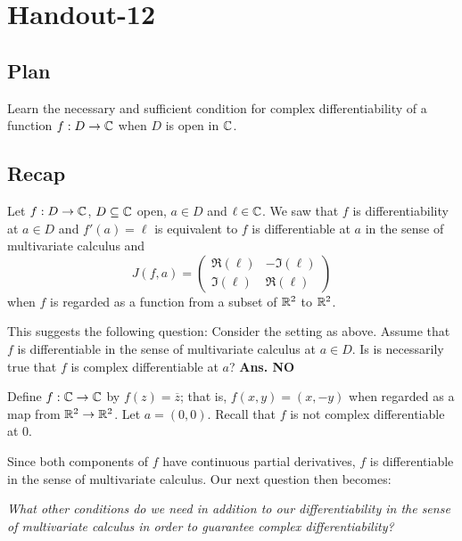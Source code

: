 \documentclass[a4paper]{article}
\begin{document}
\section{Handout-12}

\subsection{Plan}

Learn the necessary and sufficient condition for complex differentiability of a function \( f: D \to \mathbb{C}  \) when \( D  \) is open in \( \mathbb{C}  \).

\subsection{Recap}

Let \( f: D \to \mathbb{C}  \), \( D \subseteq \mathbb{C}   \) open, \( a \in D  \) and \( \ell \in \mathbb{C}  \). We saw that \( f \) is differentiability at \( a \in D  \) and \( f'(a) = \ell \) is equivalent to \( f  \) is differentiable at \( a  \) in the sense of multivariate calculus and   
\[  J(f,a) = \begin{pmatrix} \Re(\ell) & - \Im(\ell) \\ \Im(\ell) & \Re(\ell) \end{pmatrix}
\]
when \( f  \) is regarded as a function from a subset of \( \mathbb{R}^{2} \) to \( \mathbb{R}^{2} \).

This suggests the following question: Consider the setting as above. Assume that \( f  \) is differentiable in the sense of multivariate calculus at \( a \in D  \). Is is necessarily true that \( f  \) is complex differentiable at \( a  \)? \textbf{Ans. NO}

\begin{eg}
    Define \( f: \mathbb{C} \to \mathbb{C}  \) by \( f(z) = \overline{z} \); that is, \( f(x,y) = (x,-y) \) when regarded as a map from \( \mathbb{R}^{2} \to \mathbb{R}^{2} \). Let \( a = (0,0) \). Recall that \( f  \) is not complex differentiable at \( 0  \).
\end{eg}

Since both components of \( f  \) have continuous partial derivatives, \( f  \) is differentiable in the sense of multivariate calculus. Our next question then becomes:
\begin{center}
    \textit{What other conditions do we need in addition to our differentiability in the sense of multivariate calculus in order to guarantee complex differentiability?}
\end{center}
\end{document}
